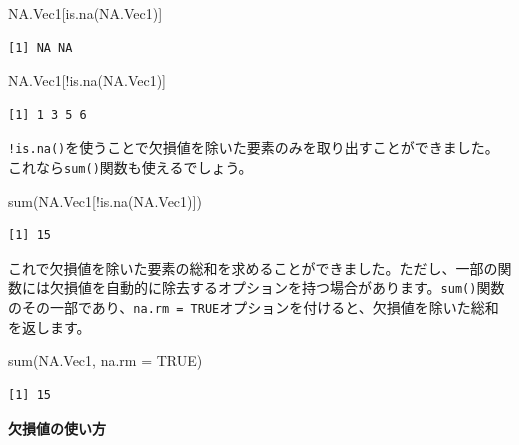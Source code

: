 \documentclass[
  a4paper,
  pandoc,
  ja=standard,
  jafont=haranoaji]{bxjsbook}
\newenvironment{Shaded}{\begin{snugshade}}{\end{snugshade}}
\newcommand{\AttributeTok}[1]{\textcolor[rgb]{0.00,0.48,0.65}{#1}}
\newcommand{\ConstantTok}[1]{\textcolor[rgb]{0.56,0.35,0.01}{#1}}
\newcommand{\FunctionTok}[1]{\textcolor[rgb]{0.28,0.35,0.67}{#1}}
\newcommand{\NormalTok}[1]{\textcolor[rgb]{0.00,0.48,0.65}{#1}}
\newcommand{\SpecialCharTok}[1]{\textcolor[rgb]{0.37,0.37,0.37}{#1}}
\begin{document}
\begin{Shaded}
\begin{Highlighting}[numbers=left,,]
\NormalTok{NA.Vec1[}\FunctionTok{is.na}\NormalTok{(NA.Vec1)]}
\end{Highlighting}
\end{Shaded}

\begin{verbatim}
[1] NA NA
\end{verbatim}

\begin{Shaded}
\begin{Highlighting}[numbers=left,,]
\NormalTok{NA.Vec1[}\SpecialCharTok{!}\FunctionTok{is.na}\NormalTok{(NA.Vec1)]}
\end{Highlighting}
\end{Shaded}

\begin{verbatim}
[1] 1 3 5 6
\end{verbatim}

\texttt{!is.na()}を使うことで欠損値を除いた要素のみを取り出すことができました。これなら\texttt{sum()}関数も使えるでしょう。

\begin{Shaded}
\begin{Highlighting}[numbers=left,,]
\FunctionTok{sum}\NormalTok{(NA.Vec1[}\SpecialCharTok{!}\FunctionTok{is.na}\NormalTok{(NA.Vec1)])}
\end{Highlighting}
\end{Shaded}

\begin{verbatim}
[1] 15
\end{verbatim}

これで欠損値を除いた要素の総和を求めることができました。ただし、一部の関数には欠損値を自動的に除去するオプションを持つ場合があります。\texttt{sum()}関数のその一部であり、\texttt{na.rm\ =\ TRUE}オプションを付けると、欠損値を除いた総和を返します。

\begin{Shaded}
\begin{Highlighting}[numbers=left,,]
\FunctionTok{sum}\NormalTok{(NA.Vec1, }\AttributeTok{na.rm =} \ConstantTok{TRUE}\NormalTok{)}
\end{Highlighting}
\end{Shaded}

\begin{verbatim}
[1] 15
\end{verbatim}

\textbf{欠損値の使い方}
\end{document}
